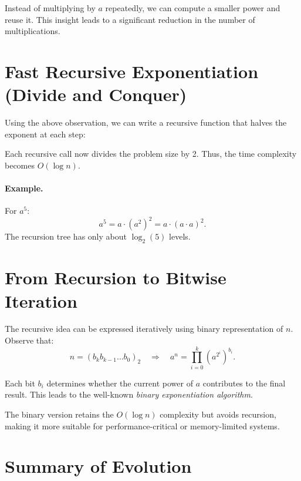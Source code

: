 \documentclass[a4paper,12pt]{article}
\begin{document}
    Instead of multiplying by \( a \) repeatedly, we can compute a smaller power and reuse it.
    This insight leads to a significant reduction in the number of multiplications.

    \section{Fast Recursive Exponentiation (Divide and Conquer)}

    Using the above observation, we can write a recursive function that halves the exponent at each step:

	

    Each recursive call now divides the problem size by 2.
    Thus, the time complexity becomes \( O(\log n) \).

    \paragraph{Example.}
    For \( a^5 \):
    \[
        a^5 = a \cdot (a^2)^2 = a \cdot (a \cdot a)^2.
    \]
    The recursion tree has only about \( \log_2(5) \) levels.

    \section{From Recursion to Bitwise Iteration}

    The recursive idea can be expressed iteratively using binary representation of \( n \).
    Observe that:
    \[
        n = (b_k b_{k-1} \ldots b_0)_2
        \quad \Rightarrow \quad
        a^n = \prod_{i=0}^{k} (a^{2^i})^{b_i}.
    \]

    Each bit \( b_i \) determines whether the current power of \( a \) contributes to the final result.
    This leads to the well-known \emph{binary exponentiation algorithm}.

	

The binary version retains the \( O(\log n) \) complexity but avoids recursion,
making it more suitable for performance-critical or memory-limited systems.

\section{Summary of Evolution}
\end{document}
